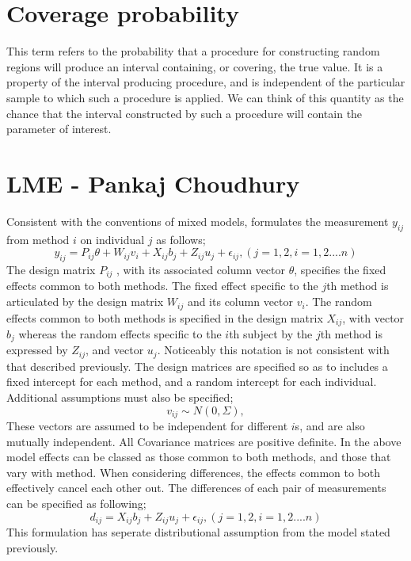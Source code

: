 \documentclass[12pt, a4paper]{report}
\theoremstyle{plain}
\theoremstyle{definition}
\theoremstyle{remark}
\begin{document}
	\section{Coverage probability}
	This term refers to the probability that a procedure for 
	constructing random regions will produce an interval containing, or covering, the 
	true value. It is a property of the interval producing procedure, and is 
	independent of the particular sample to which such a procedure is applied. We 
	can think of this quantity as the chance that the interval constructed by such a 
	procedure will contain the parameter of interest.
	
	
	


	\section{LME - Pankaj Choudhury}
	Consistent with the conventions of mixed models, \citep{pkc}
	formulates the measurement $y_{ij} $from method $i$ on individual
	$j$ as follows;
	\begin{equation}
	y_{ij} =P_{ij}\theta + W_{ij}v_{i} + X_{ij}b_{j} + Z_{ij}u_{j} +
	\epsilon_{ij},     (j=1,2, i=1,2....n)
	\end{equation}
	The design matrix $P_{ij}$ , with its associated column vector
	$\theta$, specifies the fixed effects common to both methods. The
	fixed effect specific to the $j$th method is articulated by the
	design matrix $W_{ij}$ and its column vector $v_{i}$. The random
	effects common to both methods is specified in the design matrix
	$X_{ij}$, with vector $b_{j}$ whereas the random effects specific
	to the $i$th subject by the $j$th method is expressed by $Z_{ij}$,
	and vector $u_{j}$. Noticeably this notation is not consistent
	with that described previously.  The design matrices are specified
	so as to includes a fixed intercept for each method, and a random
	intercept for each individual. Additional assumptions must also be
	specified;
	\begin{equation}
	v_{ij} \sim N(0,\Sigma),
	\end{equation}
	These vectors are assumed to be independent for different $i$s,
	and are also mutually independent. All Covariance matrices are
	positive definite.  In the above model effects can be classed as
	those common to both methods, and those that vary with method.
	When considering differences, the effects common to both
	effectively cancel each other out. The differences of each pair of
	measurements can be specified as following;
	\begin{equation}
	d_{ij} = X_{ij}b_{j} + Z_{ij}u_{j} + \epsilon_{ij},     (j=1,2,
	i=1,2....n)
	\end{equation}
	This formulation has seperate distributional assumption from the
	model stated previously.
	
\end{document}
